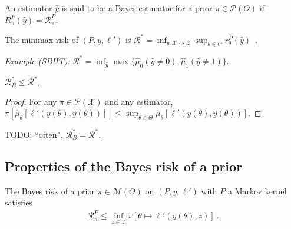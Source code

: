 \begin{definition}
  \label{def:bayesEstimator}
  \leanok
  An estimator $\hat{y}$ is said to be a Bayes estimator for a prior $\pi \in \mathcal P(\Theta)$ if $R^P_\pi(\hat{y}) = \mathcal R^P_\pi$.
\end{definition}

\begin{definition}
  \label{def:minimaxRisk}
  \leanok
  The minimax risk of $(P, y, \ell')$ is $\mathcal R^* = \inf_{\hat{y} : \mathcal X \rightsquigarrow \mathcal Z} \sup_{\theta \in \Theta} r^P_\theta(\hat{y})$~.
\end{definition}

\emph{Example (SBHT):} $\mathcal R^* = \inf_{\hat{y}} \max\{\hat{\mu}_0(\hat{y} \ne 0), \hat{\mu}_1(\hat{y} \ne 1)\}$.

\begin{lemma}
  \label{lem:bayesRisk_le_minimaxRisk}
  \leanok
  $\mathcal R_B^* \le \mathcal R^*$.
\end{lemma}

\begin{proof}\leanok
For any $\pi \in \mathcal P(\mathcal X)$ and any estimator, $\pi\left[\hat{\mu}_\theta\left[\ell'(y(\theta), \hat{y}(\theta))\right]\right] \le \sup_{\theta \in \Theta}\hat{\mu}_\theta\left[\ell'(y(\theta), \hat{y}(\theta))\right]$.
\end{proof}

TODO: ``often'', $\mathcal R^*_B = \mathcal R^*$.

\subsection{Properties of the Bayes risk of a prior}

\begin{lemma}
  \label{lem:bayesRisk_le_const}
  The Bayes risk of a prior $\pi \in \mathcal M(\Theta)$ on $(P, y, \ell')$ with $P$ a Markov kernel satisfies
  \begin{align*}
  \mathcal R^P_\pi \le \inf_{z \in \mathcal Z} \pi\left[ \theta \mapsto \ell'(y(\theta), z) \right]
  \: .
  \end{align*}
\end{lemma}

